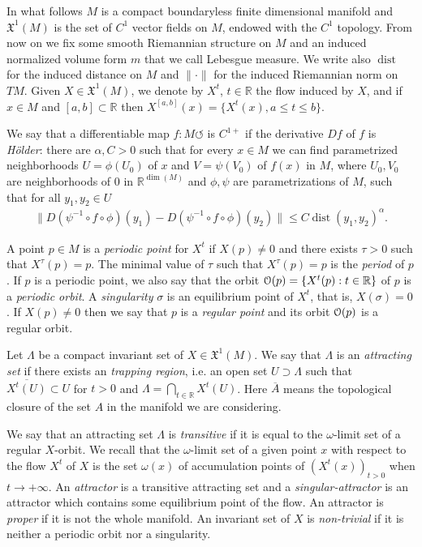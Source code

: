 \documentclass[reqno,12pt,a4paper]{amsart}
\theoremstyle{plain}
\theoremstyle{definition}
\begin{document}
In what follows $M$ is a compact boundaryless finite
dimensional manifold and ${{\mathfrak X}}^1(M)$ is the set of $C^1$
vector fields on $M$, endowed with the $C^1$ topology.  From
now on we fix some smooth Riemannian structure on $M$ and an
induced normalized volume form $m$ that we call Lebesgue
measure.  We write also ${\operatorname{dist}}$ for the induced distance on
$M$ and $\|\cdot\|$ for the induced Riemannian norm on $TM$.
Given $X \in {{\mathfrak X}}^1(M)$, we denote by $X^t$, $t \in {{\mathbb R}}$
the flow induced by $X$, and if $x \in M$ and $[a,b]\subset
{{\mathbb R}}$ then $X^{[a,b]}(x)= \{X^t(x), a\leq t \leq b\}$.

We say that a differentiable map $f:M\circlearrowleft$ is
$C^{1+}$ if the derivative $Df$ of $f$ is \emph{H\"older}:
there are $\alpha,C>0$ such that for every $x\in M$ we can
find parametrized neighborhoods $U=\phi(U_0)$ of $x$ and
$V=\psi(V_0)$ of $f(x)$ in $M$, where $U_0,V_0$ are
neighborhoods of $0$ in ${{\mathbb R}}^{\dim(M)}$ and $\phi,\psi$ are
parametrizations of $M$, such that for all $y_1,y_2\in U$
\begin{align*}
  \|D(\psi^{-1}\circ f\circ \phi)(y_1)-D(\psi^{-1}\circ
  f\circ \phi)(y_2)\|
  \le
  C {\operatorname{dist}}(y_1,y_2)^\alpha.
\end{align*}

A point $p\in M$ is a \emph{periodic point} for $X^t$ if
$X(p)\neq0$ and there exists $\tau>0$ such that
$X^\tau(p)=p$. The minimal value of $\tau$ such that
$X^\tau(p)=p$ is the \emph{period} of $p$. If $p$ is a
periodic point, we also say that the orbit ${\EuScript{O}}(p)=\{
X^t(p): t\in{{\mathbb R}}\}$ of $p$ is a \emph{periodic orbit}. A
\emph{singularity} $\sigma$ is an equilibrium point of
$X^t$, that is, $X(\sigma)=0$. If $X(p)\neq0$ then we say
that $p$ is a \emph{regular point} and its orbit ${\EuScript{O}}(p)$ is
a regular orbit.

Let $\Lambda$ be a compact invariant set of $X\in
{{\mathfrak X}}^1(M)$.  We say that $\Lambda$ is an \emph{attracting
  set} if there exists an \emph{trapping region}, i.e. an
open set $U\supset \Lambda$ such that
$\overline{X^t(U)}\subset U$ for $t>0$ and $ \Lambda
=\bigcap_{t\in {{\mathbb R}}}X^t(U)$. Here $\overline{A}$ means the
topological closure of the set $A$ in the manifold we are
considering.

We say that an attracting set
$\Lambda$ is \emph{transitive} if it is equal to the
$\omega$-limit set of a regular $X$-orbit. We recall that
the $\omega$-limit set of a given point $x$ with respect to
the flow $X^t$ of $X$ is the set $\omega(x)$ of accumulation
points of $(X^t(x))_{t>0}$ when $t\to+\infty$.  An
\emph{attractor} is a transitive attracting set and a
\emph{singular-attractor} is an attractor which contains
some equilibrium point of the flow.  An attractor is
\emph{proper} if it is not the whole manifold.  An invariant
set of $X$ is \emph{non-trivial} if it is neither a periodic
orbit nor a singularity.
\end{document}
